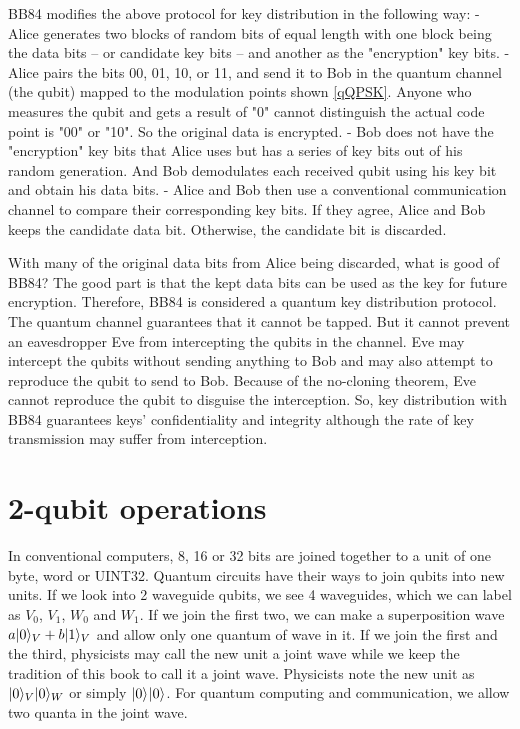 \documentclass[Letter,11pt]{book}
\begin{document}
BB84 modifies the above protocol for key distribution in the following way:
- Alice generates two blocks of random bits of equal length with one block being the data bits -- or candidate key bits -- and another as the "encryption" key bits.
- Alice pairs the bits 00, 01, 10, or 11, and send it to Bob in the quantum channel (the qubit) mapped to the modulation points shown \ref{qQPSK}. Anyone who measures the qubit and gets a result of "0" cannot distinguish the actual code point is "00" or "10". So the original data is encrypted.
- Bob does not have the "encryption" key bits that Alice uses but has a series of key bits out of his random generation. And Bob demodulates each received qubit using his key bit and obtain his data bits.
- Alice and Bob then use a conventional communication channel to compare their corresponding key bits. If they agree, Alice and Bob keeps the candidate data bit. Otherwise, the candidate bit is discarded.

With many of the original data bits from Alice being discarded, what is good of BB84? The good part is that the kept data bits can be used as the key for future encryption. Therefore, BB84 is considered a quantum key distribution protocol. The quantum channel guarantees that it cannot be tapped. But it cannot prevent an eavesdropper Eve from intercepting the qubits in the channel. Eve may intercept the qubits without sending anything to Bob and may also attempt to reproduce the qubit to send to Bob. Because of the no-cloning theorem, Eve cannot reproduce the qubit to disguise the interception. So, key distribution with BB84 guarantees keys' confidentiality and integrity although the rate of key transmission may suffer from interception.

\section{2-qubit operations}
In conventional computers, 8, 16 or 32 bits are joined together to a unit of one byte, word or UINT32. Quantum circuits have their ways to join qubits into new units. If we look into 2 waveguide qubits, we see 4 waveguides, which we can label as $V_0$, $V_1$, $W_0$ and $W_1$. If we join the first two, we can make a superposition wave $a\keta[V]{0}+b\keta[V]{1}$ and allow only one quantum of wave in it. If we join the first and the third, physicists may call the new unit a joint wave while we keep the tradition of this book to call it a joint wave. Physicists note the new unit as $\keta[V]{0} \keta[W]{0}$ or simply $\keta{0}\keta{0}$. For quantum computing and communication, we allow two quanta in the joint wave.
\end{document}
